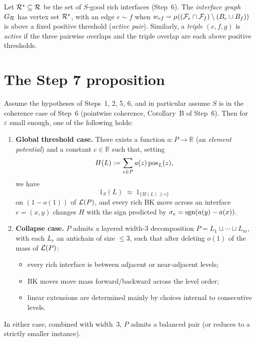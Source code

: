 \begin{definition}\label{def:G_Rich}
Let $\mathcal{R}^\star\subseteq\mathcal{R}$ be the set of $S$-good rich interfaces
(Step~6).
The \emph{interface graph} $G_{\mathcal{R}}$ has vertex set $\mathcal{R}^\star$,
with an edge $e\sim f$ when
$w_{ef}=\mu((\mathcal{F}_{e}\cap\mathcal{F}_{f})\setminus(B_e\cup B_f))$ is above
a fixed positive threshold (\emph{active pair}).
Similarly, a \emph{triple} $(e,f,g)$ is \emph{active} if the three
pairwise overlaps and the triple overlap are each above positive
thresholds.
\end{definition}

\section{The Step 7 proposition}

\begin{proposition}\label{prop:step7-informal}
Assume the hypotheses of Steps~1, 2, 5, 6, and in particular assume
$S$ is in the coherence case of Step~6 (pointwise coherence,
Corollary~B of Step~6).
Then for $\varepsilon$ small enough, one of the following holds:

\begin{enumerate}[label=(\roman*),nosep]
  \item \textbf{Global threshold case.}
  There exists a function $a\colon P\to\mathbb{R}$ (an \emph{element
  potential}) and a constant $c\in\mathbb{R}$ such that, setting
  \[
    H(L) := \sum_{z\in P} a(z)\,\mathrm{pos}_L(z),
  \]
  we have
  \[
    1_S(L) \;\approx\; 1_{\{H(L)\ge c\}}
  \]
  on $(1-o(1))$ of $\mathcal{L}(P)$, and every rich BK move across an
  interface $e=(x,y)$ changes $H$ with the sign predicted by $\sigma_e
  =\operatorname{sgn}(a(y)-a(x))$.

  \item \textbf{Collapse case.}
  $P$ admits a layered width-$3$ decomposition
  $P = L_1\sqcup\cdots\sqcup L_m$, with each $L_r$ an antichain of
  size $\le 3$, such that after deleting $o(1)$ of the mass of
  $\mathcal{L}(P)$:
  \begin{itemize}[nosep]
    \item every rich interface is between adjacent or near-adjacent
      levels;
    \item BK moves move mass forward/backward across the level order;
    \item linear extensions are determined mainly by choices internal
      to consecutive levels.
  \end{itemize}
\end{enumerate}
In either case, combined with width~$3$, $P$ admits a balanced pair
(or reduces to a strictly smaller instance).
\end{proposition}

